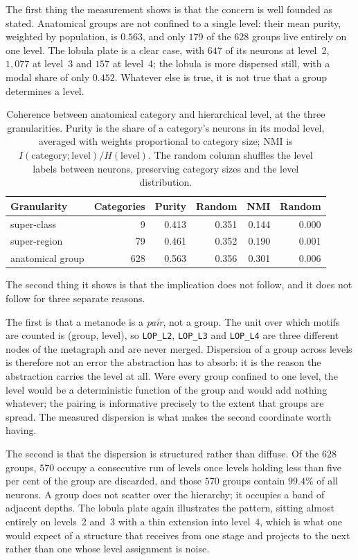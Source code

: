 \documentclass[12pt,a4paper,oneside]{article}
\theoremstyle{definition}
\theoremstyle{plain}
\newcommand{\code}[1]{\texttt{#1}}
\begin{document}
The first thing the measurement shows is that the concern is well founded as
stated. Anatomical groups are not confined to a single level: their mean
purity, weighted by population, is $0.563$, and only $179$ of the $628$
groups live entirely on one level. The lobula plate is a clear case, with
$647$ of its neurons at level~2, $1{,}077$ at level~3 and $157$ at level~4;
the lobula is more dispersed still, with a modal share of only $0.452$.
Whatever else is true, it is not true that a group determines a level.

\begin{table}[H]
\centering
\caption{Coherence between anatomical category and hierarchical level, at
the three granularities. Purity is the share of a category's neurons in its
modal level, averaged with weights proportional to category size; NMI is
$I(\text{category};\text{level})/H(\text{level})$. The random column shuffles
the level labels between neurons, preserving category sizes and the level
distribution.}
\label{tab:coherence}
\begin{tabular}{lrrrrr}
\toprule
Granularity & Categories & Purity & Random & NMI & Random \\
\midrule
super-class      & 9   & 0.413 & 0.351 & 0.144 & 0.000 \\
super-region     & 79  & 0.461 & 0.352 & 0.190 & 0.001 \\
anatomical group & 628 & 0.563 & 0.356 & 0.301 & 0.006 \\
\bottomrule
\end{tabular}
\end{table}

The second thing it shows is that the implication does not follow, and it
does not follow for three separate reasons.

The first is that a metanode is a \emph{pair}, not a group. The unit over
which motifs are counted is (group, level), so \code{LOP\_L2},
\code{LOP\_L3} and \code{LOP\_L4} are three different nodes of the metagraph
and are never merged. Dispersion of a group across levels is therefore not
an error the abstraction has to absorb: it is the reason the abstraction
carries the level at all. Were every group confined to one level, the level
would be a deterministic function of the group and would add nothing
whatever; the pairing is informative precisely to the extent that groups are
spread. The measured dispersion is what makes the second coordinate worth
having.

The second is that the dispersion is structured rather than diffuse. Of the
$628$ groups, $570$ occupy a consecutive run of levels once levels holding
less than five per cent of the group are discarded, and those $570$ groups
contain $99.4\%$ of all neurons. A group does not scatter over the hierarchy;
it occupies a band of adjacent depths. The lobula plate again illustrates the
pattern, sitting almost entirely on levels~2 and~3 with a thin extension into
level~4, which is what one would expect of a structure that receives from one
stage and projects to the next rather than one whose level assignment is
noise.
\end{document}
